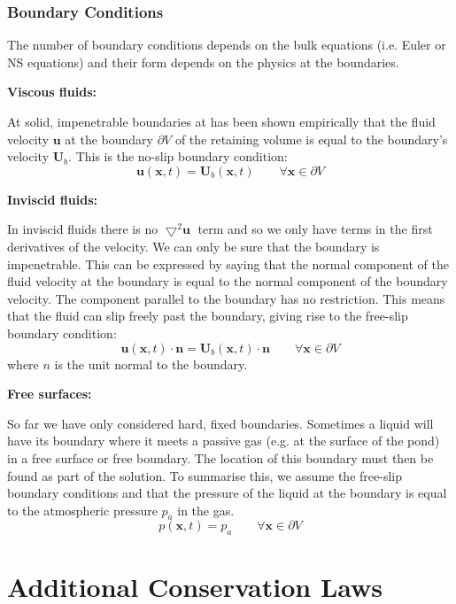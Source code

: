 \documentclass[11pt]{article}
\newcommand{\grad}{\bigtriangledown}
\newcommand{\mv}[1]{\textbf{#1}}
\newcommand{\mdf}[1]{{\color{red}#1}}
\begin{document}
\subsubsection{Boundary Conditions}
The number of boundary conditions depends on the bulk equations (i.e. Euler or NS equations) and their form depends on the physics at the boundaries.

\textbf{Viscous fluids:}

At solid, impenetrable boundaries at has been shown empirically that the fluid velocity $\mv{u}$ at the boundary $\partial V$ of the retaining volume is equal to the boundary's velocity $\mv{U}_b$. This is the \mdf{no-slip boundary condition}:
$$\mv{u}(\mv{x},t)=\mv{U}_b(\mv{x},t)\quad\quad\forall\mv{x}\in\partial V$$

\textbf{Inviscid fluids:}

In inviscid fluids there is no $\grad^2 \mv{u}$ term and so we only have terms in the first derivatives of the velocity.
We can only be sure that the boundary is impenetrable.
This can be expressed by saying that the normal component of the fluid velocity at the boundary is equal to the normal component of the boundary velocity.
The component parallel to the boundary has no restriction.
This means that the fluid can slip freely past the boundary, giving rise to the \mdf{free-slip boundary condition}:
$$\mv{u}(\mv{x},t)\cdot\mv{n}=\mv{U}_b(\mv{x},t)\cdot\mv{n}\quad\quad\forall\mv{x}\in\partial V$$
where $n$ is the unit normal to the boundary.

\textbf{Free surfaces:}

So far we have only considered hard, fixed boundaries. Sometimes a liquid will have its boundary where it meets a passive gas (e.g. at the surface of the pond) in a \mdf{free surface} or \mdf{free boundary}.
The location of this boundary must then be found as part of the solution.
To summarise this, we assume the free-slip boundary conditions and that the pressure of the liquid at the boundary is equal to the atmospheric pressure $p_a$ in the gas.
$$p(\mv{x},t)=p_a\quad\quad\forall\mv{x}\in\partial V$$

\section{Additional Conservation Laws}
\end{document}
